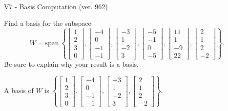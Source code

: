 \begin{exercise}
  \begin{exerciseTitle}V7 - Basis Computation (ver. 962)\end{exerciseTitle}
  \begin{exerciseStatement}
    Find a basis for the subspace 
\[W=\mathrm{span}\ \left\{\left[\begin{array}{r}
1 \\
2 \\
3 \\
0
\end{array}\right] , \left[\begin{array}{r}
-4 \\
0 \\
-1 \\
-1
\end{array}\right] , \left[\begin{array}{r}
-3 \\
1 \\
-2 \\
3
\end{array}\right] , \left[\begin{array}{r}
-5 \\
-1 \\
0 \\
-5
\end{array}\right] , \left[\begin{array}{r}
11 \\
1 \\
-9 \\
22
\end{array}\right] , \left[\begin{array}{r}
2 \\
1 \\
2 \\
-2
\end{array}\right]\right\}.\]
 Be sure to explain why your result is a basis.


  \end{exerciseStatement}
  \begin{exerciseAnswer}
   A basis of \(W\) is  \(\left\{\left[\begin{array}{r}
1 \\
2 \\
3 \\
0
\end{array}\right] , \left[\begin{array}{r}
-4 \\
0 \\
-1 \\
-1
\end{array}\right] , \left[\begin{array}{r}
-3 \\
1 \\
-2 \\
3
\end{array}\right] , \left[\begin{array}{r}
2 \\
1 \\
2 \\
-2
\end{array}\right]\right\}\).
  


  \end{exerciseAnswer}
\end{exercise}